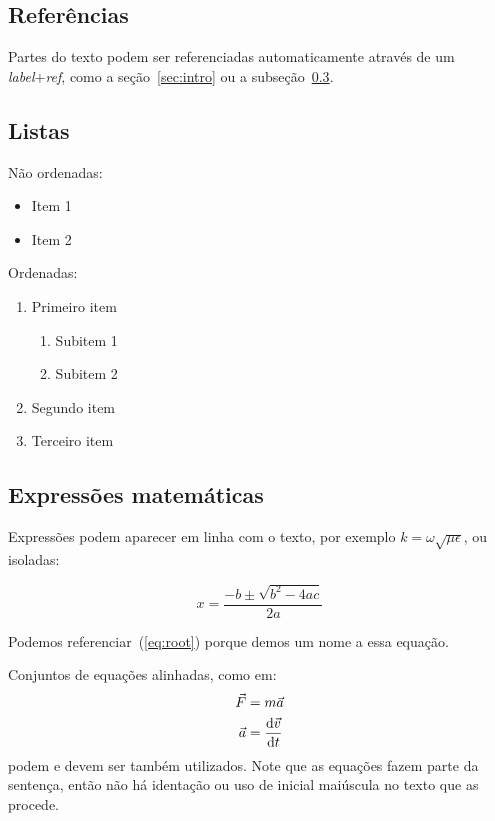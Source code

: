 \documentclass[a4paper,11pt]{article}
\begin{document}
\subsection{Referências}

Partes do texto podem ser referenciadas automaticamente através de um \emph{label}+\emph{ref}, como a seção~\ref{sec:intro} ou a subseção~\ref{ssec:math}.


\subsection{Listas}

Não ordenadas:

\begin{itemize}
	\item Item 1
	\item Item 2
\end{itemize}

Ordenadas:

\begin{enumerate}
	\item Primeiro item
	\begin{enumerate}
		\item Subitem 1
		\item Subitem 2
	\end{enumerate}
	\item Segundo item
	\item Terceiro item
\end{enumerate}


\subsection{Expressões matemáticas}
\label{ssec:math}

Expressões podem aparecer em linha com o texto, por exemplo $k = \omega \sqrt{\mu \epsilon}$, ou isoladas:

\begin{equation}
\label{eq:root}
x = \frac{-b \pm \sqrt{b^2 - 4ac}}{2a}
\end{equation}

Podemos referenciar~(\ref{eq:root}) porque demos um nome a essa equação.

Conjuntos de equações alinhadas, como em:
%
\begin{align}
\vec{F} &= m \vec{a} \\
\vec{a} &= \frac{{\rm d}\vec{v}}{{\rm d}t}
\end{align}
%
podem e devem ser também utilizados.
Note que as equações fazem parte da sentença, então não há identação ou uso de inicial maiúscula no texto que as procede.
\end{document}
